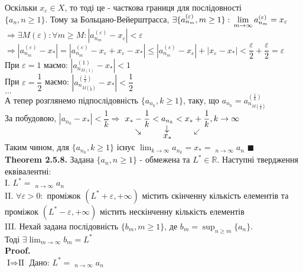 \documentclass[a4paper, 14pt]{extarticle}
\DeclareMathOperator*\uplim{\overline{lim}}
\DeclareMathOperator*\downlim{\underline{lim}}
\def\huge{\displaystyle}
\def\bigline{\vspace{5mm}\\}
\def\th#1{\textbf{Theorem {#1}}}
\def\proof{\textbf{Proof.}\\}
\def\bigline{\vspace{5mm}\\}
\def\qed{$\blacksquare$}
\begin{document}
	Оскільки $x_\varepsilon \in X$, то тоді це - часткова границя для послідовності \\ $\{a_n, n \geq 1\}$. Тому за Больцано-Вейерштрасса, $\exists \{a_{n_m}^{(\varepsilon)}, m \geq 1\}: \huge \\ \lim_{m \to \infty} a_{n_m}^{(\varepsilon)} = x_{\varepsilon}$\\
	$\Rightarrow \exists M(\varepsilon): \forall m \geq M: |a_{n_m}^{(\varepsilon)} - x_{\varepsilon}| < \varepsilon$\\
	$\Rightarrow |a_{n_m}^{(\varepsilon)} - x_*| = |a_{n_m}^{(\varepsilon)} - x_{\varepsilon} + x_{\varepsilon} - x_*| \leq |a_{n_m}^{(\varepsilon)} - x_{\varepsilon}| + |x_{\varepsilon} - x_*| < \dfrac{\varepsilon}{2} + \dfrac{\varepsilon}{2} = \varepsilon$\\
	При $\varepsilon = 1$ маємо: $|a_{n_{M(1)}}^{(1)} - x_*| < 1$\\
	При $\varepsilon = \dfrac{1}{2}$ маємо: $|a_{n_{M(\frac{1}{2})}}^{(\frac{1}{2})} - x_*| < \dfrac{1}{2}$\\
	$\dots$\\
	А тепер розглянемо підпослідовність $\{a_{n_k}, k \geq 1\}$, таку, що $a_{n_k} = a_{n_{M(\frac{1}{k})}}^{(\frac{1}{k})}$\\
	За побудовою, $|a_{n_k} - x_*| < \dfrac{1}{k} \Rightarrow$ $\displaystyle \underset{\rotatebox[origin=c]{-45}{$\rightarrow$}}{x_*-\frac{1}{k}} < \underset{\underset{\displaystyle x_*}{\rotatebox[origin=c]{90}{$\leftarrow$}}}{a_{n_k}} < \underset{\rotatebox[origin=c]{45}{$\leftarrow$}}{x_*+\frac{1}{k}}, k \to \infty$\\
	Таким чином, для $\{a_{n_k}, k \geq 1\}$ існує $\huge \lim_{k \to \infty} a_{n_k} = x_* = \downlim_{n \to \infty} a_n$ \qed
	\bigline
	\th{2.5.8.} Задана $\{a_n, n \geq 1\}$ - обмежена та $L^* \in \mathbb{R}$. Наступні твердження еквівалентні:\\
	I. $L^* = \huge \uplim_{n \to \infty} a_n$\\
	II. $\forall \varepsilon > 0:$ проміжок $(L^*+\varepsilon, + \infty)$ містить скінченну кількість елементів та проміжок $(L^*-\varepsilon, + \infty)$ містить нескінченну кількість елементів\\
	III. Нехай задана послідовність $\{b_m, m \geq 1\}$, де $b_m = \huge \sup_{n \geq m} \{a_n\}$. \\ Тоді $\exists \huge \lim_{m \to \infty} b_m = L^*$\\
	\proof
	$\boxed{\textrm{I} \Rightarrow \textrm{II}}$ Дано: $L^* =  \huge \uplim_{n \to \infty} a_n$\\
\end{document}
